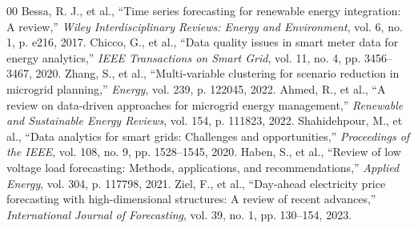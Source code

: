 \documentclass[conference]{IEEEtran}
\begin{document}
\begin{thebibliography}{00}
 Bessa, R. J., et al., ``Time series forecasting for renewable energy integration: A review,'' \textit{Wiley Interdisciplinary Reviews: Energy and Environment}, vol. 6, no. 1, p. e216, 2017.
 Chicco, G., et al., ``Data quality issues in smart meter data for energy analytics,'' \textit{IEEE Transactions on Smart Grid}, vol. 11, no. 4, pp. 3456--3467, 2020.
 Zhang, S., et al., ``Multi-variable clustering for scenario reduction in microgrid planning,'' \textit{Energy}, vol. 239, p. 122045, 2022.
 Ahmed, R., et al., ``A review on data-driven approaches for microgrid energy management,'' \textit{Renewable and Sustainable Energy Reviews}, vol. 154, p. 111823, 2022.
 Shahidehpour, M., et al., ``Data analytics for smart grids: Challenges and opportunities,'' \textit{Proceedings of the IEEE}, vol. 108, no. 9, pp. 1528--1545, 2020.
 Haben, S., et al., ``Review of low voltage load forecasting: Methods, applications, and recommendations,'' \textit{Applied Energy}, vol. 304, p. 117798, 2021.
 Ziel, F., et al., ``Day-ahead electricity price forecasting with high-dimensional structures: A review of recent advances,'' \textit{International Journal of Forecasting}, vol. 39, no. 1, pp. 130--154, 2023.
\end{thebibliography}
\end{document}
